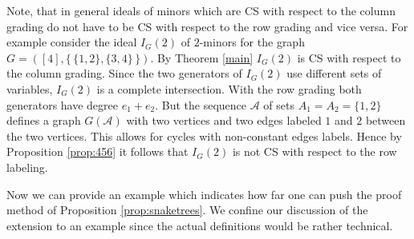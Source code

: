 \documentclass{amsart}
\theoremstyle{definition}
\numberwithin{equation}{section}
\def\cA{\mathcal{A}}
\begin{document}
Note, that in general ideals of minors which are CS with respect to the column grading do not have to be CS with respect to the row grading and vice versa. 
For example consider the ideal $I_G(2)$ of $2$-minors
for the graph $G = ([4],\{\,\{1,2\},\{3,4\}\,\})$.
By Theorem \ref{main} $I_G(2)$ is CS with respect to the
column grading. Since the two generators 
of $I_G(2)$ use different sets of variables, $I_G(2)$ is
a complete intersection. With the row grading both 
generators have degree $e_1+e_2$. But the sequence 
$\cA$ of sets
$A_1 = A_2 = \{1,2\}$ defines a graph $G(\cA)$ with two
vertices and two edges labeled $1$ and $2$ between the two 
vertices. This allows for cycles with non-constant edges labels. Hence by Proposition \ref{prop:456} it follows
that $I_G(2)$ is not CS with respect to the row labeling.

Now we can provide an example which indicates how far
one can push the proof method of
Proposition \ref{prop:snaketrees}. 
We confine our discussion of the extension to an example
since the actual definitions would be rather technical.
\end{document}
